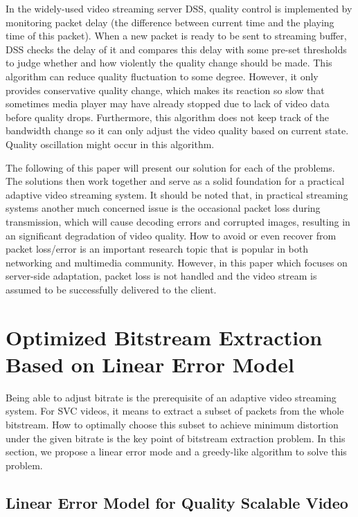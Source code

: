 \documentclass[journal]{IEEEtran}
\begin{document}
In the widely-used video streaming server DSS, quality control is implemented by monitoring packet delay (the difference between current time and the playing time of this packet). When a new packet is ready to be sent to streaming buffer, DSS checks the delay of it and compares this delay with some pre-set thresholds to judge whether and how violently the quality change should be made. This algorithm can reduce quality fluctuation to some degree. However, it only provides conservative quality change, which makes its reaction so slow that sometimes media player may have already stopped due to lack of video data before quality drops. Furthermore, this algorithm does not keep track of the bandwidth change so it can only adjust the video quality based on current state. Quality oscillation might occur in this algorithm.

The following of this paper will present our solution for each of the problems. The solutions then work together and serve as a solid foundation for a practical adaptive video streaming system. It should be noted that, in practical streaming systems another much concerned issue is the occasional packet loss during transmission, which will cause decoding errors and corrupted images, resulting in an significant degradation of video quality. How to avoid or even recover from packet loss/error is an important research topic that is popular in both networking and multimedia community. However, in this paper which focuses on server-side adaptation, packet loss is not handled and the video stream is assumed to be successfully delivered to the client.

\section{Optimized Bitstream Extraction Based on Linear Error Model}
\label{sec:bitstream-extraction}

Being able to adjust bitrate is the prerequisite of an adaptive video streaming system. For SVC videos, it means to extract a subset of packets from the whole bitstream. How to optimally choose this subset to achieve minimum distortion under the given bitrate is the key point of bitstream extraction problem. In this section, we propose a linear error mode and a greedy-like algorithm to solve this problem.

\subsection{Linear Error Model for Quality Scalable Video}
\label{subsec:linear-model}
\end{document}
